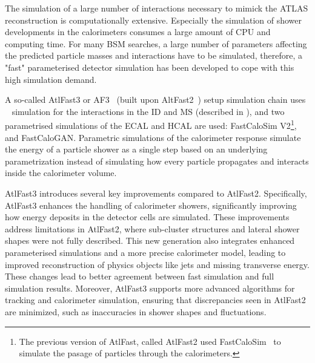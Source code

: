 The simulation of a large number of interactions necessary to mimick the \ac{ATLAS} reconstruction is computationally extensive. Especially the simulation of shower developments in the calorimeters consumes a large amount of CPU and computing time. For many \ac{BSM} searches, a large number of parameters affecting the predicted particle masses and interactions have to be simulated, therefore, a "fast" parameterised detector simulation has been developed to cope with this high simulation demand.

A so-called AtlFast3 or AF3~\cite{ATLAS-AF3} (built upon AltFast2~\cite{ATLAS-AF2}) setup simulation chain uses \GEANT~\cite{Geant4} simulation for the interactions in the \ac{ID} and \ac{MS} (described in \Ch{\ref{ch:atlas}}), and two parametrised simulations of the \ac{ECAL} and \ac{HCAL} are used: FastCaloSim V2\footnote{The previous version of AtlFast, called AtlFast2 used FastCaloSim~\cite{ATLAS-FastCaloSim} to simulate the pasage of particles through the calorimeters.}, and FastCaloGAN.
Parametric simulations of the calorimeter response simulate the energy of a particle shower as a single step based on an underlying parametrization instead of simulating how every particle propagates and interacts inside the calorimeter volume.

AtlFast3 introduces several key improvements compared to AtlFast2. Specifically, AtlFast3 enhances the handling of calorimeter showers, significantly improving how energy deposits in the detector cells are simulated. These improvements address limitations in AtlFast2, where sub-cluster structures and lateral shower shapes were not fully described. This new generation also integrates enhanced parameterised simulations and a more precise calorimeter model, leading to improved reconstruction of physics objects like jets and missing transverse energy. These changes lead to better agreement between fast simulation and full simulation results.
Moreover, AtlFast3 supports more advanced algorithms for tracking and calorimeter simulation, ensuring that discrepancies seen in AtlFast2 are minimized, such as inaccuracies in shower shapes and fluctuations.

